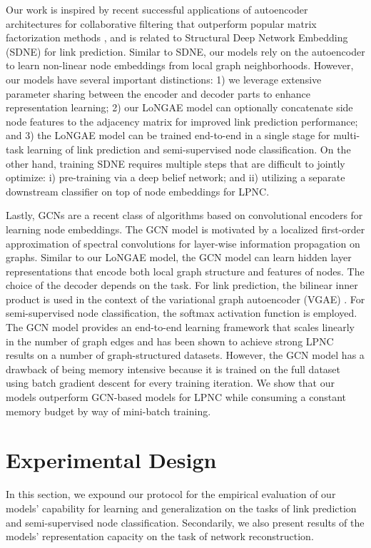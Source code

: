 \documentclass[letterpaper, conference]{IEEEtran}
\begin{document}
Our work is inspired by recent successful applications of autoencoder architectures for collaborative filtering that outperform popular matrix factorization methods \cite{Sedhain:2015,Strub:2016,Kuchaiev:2017}, and is related to Structural Deep Network Embedding (SDNE) \cite{Wang:2016} for link prediction. Similar to SDNE, our models rely on the autoencoder to learn non-linear node embeddings from local graph neighborhoods. However, our models have several important distinctions: 1) we leverage extensive parameter sharing between the encoder and decoder parts to enhance representation learning; 2) our LoNGAE model can optionally concatenate side node features to the adjacency matrix for improved link prediction performance; and 3) the LoNGAE model can be trained end-to-end in a single stage for multi-task learning of link prediction and semi-supervised node classification. On the other hand, training SDNE requires multiple steps that are difficult to jointly optimize: i) pre-training via a deep belief network; and ii) utilizing a separate downstream classifier on top of node embeddings for LPNC.

Lastly, GCNs \cite{Kipf:2016} are a recent class of algorithms based on convolutional encoders for learning node embeddings. The GCN model is motivated by a localized first-order approximation of spectral convolutions for layer-wise information propagation on graphs. Similar to our LoNGAE model, the GCN model can learn hidden layer representations that encode both local graph structure and features of nodes. The choice of the decoder depends on the task. For link prediction, the bilinear inner product is used in the context of the variational graph autoencoder (VGAE) \cite{VGAE:2016}. For semi-supervised node classification, the softmax activation function is employed. The GCN model provides an end-to-end learning framework that scales linearly in the number of graph edges and has been shown to achieve strong LPNC results on a number of graph-structured datasets. However, the GCN model has a drawback of being memory intensive because it is trained on the full dataset using batch gradient descent for every training iteration. We show that our models outperform GCN-based models for LPNC while consuming a constant memory budget by way of mini-batch training.

\section{Experimental Design}
In this section, we expound our protocol for the empirical evaluation of our models' capability for learning and generalization on the tasks of link prediction and semi-supervised node classification. Secondarily, we also present results of the models' representation capacity on the task of network reconstruction.
\end{document}

